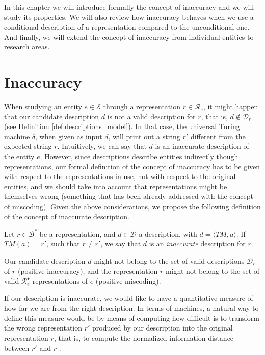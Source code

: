 In this chapter we will introduce formally the concept of inaccuracy and we will study its properties. We will also review how inaccuracy behaves when we use a conditional description of a representation compared to the unconditional one. And finally, we will extend the concept of inaccuracy from individual entities to research areas.

%
%

\section{Inaccuracy}
\label{sec:inaccuracy:inaccuracy}

When studying an entity $e \in \mathcal{E}$ through a representation $r \in \mathcal{R}_e$, it might happen that our candidate description $d$ is not a valid description for $r$, that is, $d \notin \mathcal{D}_r$ (see Definition \ref{def:descriptions_model}). In that case, the universal Turing machine $\delta$, when given as input $d$, will print out a string $r'$ different from the expected string $r$. Intuitively, we can say that $d$ is an inaccurate description of the entity $e$. However, since descriptions describe entities indirectly though representations, our formal definition of the concept of inaccuracy has to be given with respect to the representations in use, not with respect to the original entities, and we should take into account that representations might be themselves wrong (something that has been already addressed with the concept of miscoding). Given the above considerations, we propose the following definition of the concept of inaccurate description.

\begin{definition}
Let $r \in \mathcal{B}^\ast$ be a representation, and $d \in \mathcal{D}$ a description, with $ d = \langle TM, a \rangle$. If $TM(a) = r'$, such that $r \neq r'$, we say that $d$ is an \emph{inaccurate} description for $r$.
\end{definition}

Our candidate description $d$ might not belong to the set of valid descriptions $\mathcal{D}_r$ of $r$ (positive inaccuracy), and the representation $r$ might not belong to the set of valid $\mathcal{R}^\star_e$ representations of $e$ (positive miscoding).

If our description is inaccurate, we would like to have a quantitative measure of how far we are from the right description. In terms of machines, a natural way to define this measure would be by means of computing how difficult is to transform the wrong representation $r'$ produced by our description into the original representation $r$, that is, to compute the normalized information distance between $r'$ and $r$ .

